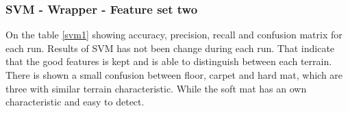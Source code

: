 \documentclass[USenglish]{ifimaster}  %
\begin{document}
\subsubsection{SVM - Wrapper - Feature set two}
On the table \ref{svm1} showing accuracy, precision, recall and confusion matrix for each run. Results of SVM has not been change during each run. That indicate that the good features is kept and is able to distinguish between each terrain. There is shown a small confusion between floor, carpet and hard mat, which are three with similar terrain characteristic. While the soft mat has an own characteristic and easy to detect. 



\begin{table}[h]
\centering
{}
\end{table}
\end{document}
